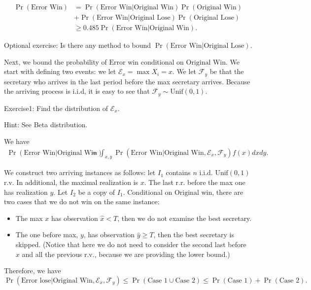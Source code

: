 \begin{align*}
    \Pr(\text{Error Win}) &= \Pr(\text{Error Win} \vert \text{Original Win}) \Pr(\text{Original Win}) \\&+ \Pr(\text{Error Win} \vert \text{Original Lose}) \Pr(\text{Original Lose}) \\& \geq 0.485 \Pr(\text{Error Win} \vert \text{Original Win}).
\end{align*}

{\color{red} Optional exercise: Is there any method to bound $\Pr(\text{Error Win} \vert \text{Original Lose})$. }

Next, we bound the probability of $\text{Error win}$ conditional on $\text{Original Win}$. We start with defining two events: we let $\mathcal E_x=\max X_i = x$. We let $\mathcal F_y$ be that the secretary who arrives in the last period before the max secretary arrives. Because the arriving process is i.i.d, it is easy to see that $\mathcal F_y \sim \text{Unif}(0,1)$.

{\color{red} Exercise1: Find the distribution of $\mathcal E_x$.}

{\color{blue} Hint: See Beta distribution.}

We have 
\begin{align*}
    \Pr(\text{Error Win} \vert \text{Original Win}) &= \int_{x,y}  \Pr(\text{Error Win} \vert \text{Original Win}, \mathcal E_x, \mathcal F_y) f(x) dxdy.
\end{align*}

We construct two arriving instances as follows: let $I_1$ contains $n$ i.i.d. $\text{Unif}(0,1)$ r.v. In additional, the maximal realization is $x$. The last r.r. before the max one has realization $y$. Let $I_2$ be a copy of $I_1$. Conditional on $\text{Original win}$, there are two cases that we do not win on the same instance:

\begin{itemize}
    \item The max $x$ has observation $\hat{x} < T$, then we do not examine the best secretary.
    \item The one before max, $y$, has observation $\hat{y} \geq T$, then the best secretary is skipped. (Notice that here we do not need to consider the second last before $x$ and all the previous r.v., because we are providing the lower bound.)
\end{itemize}

Therefore, we have
\[
\Pr(\text{Error lose} \vert \text{Original Win}, \mathcal E_x, \mathcal F_y) \leq \Pr(\text{Case 1} \cup \text{Case 2}) \leq \Pr(\text{Case 1})+\Pr(\text{Case 2}).
\]

